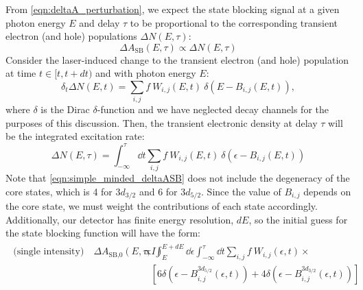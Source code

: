 From \cref{eqn:deltaA_perturbation}, we expect the state blocking signal at a given photon energy $E$ and delay $\tau$ to be proportional to the corresponding transient electron (and hole) populations $\Delta N(E, \tau)$:
\begin{equation}
\label{eqn:simple_minded_deltaASB}
\Delta A_{\textrm{SB}}(E,\tau) \propto \Delta N(E, \tau)
\end{equation}
Consider the laser-induced change to the transient electron (and hole) population at time $t \in [t, t+dt)$ and with photon energy $E$:
\begin{equation}
\delta_t \Delta N(E, t) = \sum_{i,j} f \ W_{i,j}(E, t) \ \delta(E-B_{i,j}(E, t)),
\end{equation}
where $\delta$ is the Dirac $\delta$-function and we have neglected decay channels for the purposes of this discussion. Then, the transient electronic density at delay $\tau$ will be the integrated excitation rate:
\begin{equation}
\Delta N(E, \tau) = \int_{-\infty}^{\tau} \dd{t} \sum_{i,j} f \ W_{i,j}(E, t) \ \delta(\epsilon-B_{i,j}(E, t))
\end{equation}
Note that \cref{eqn:simple_minded_deltaASB} does not include the degeneracy of the core states, which is 4 for $3d_{3/2}$ and 6 for $3d_{5/2}$. Since the value of $B_{i,j}$ depends on the core state, we must weight the contributions of each state accordingly. Additionally, our detector has finite energy resolution, $dE$, so the initial guess for the state blocking function will have the form:
\begin{align}
\label{eqn:nonlinear_deltaASB0}
\begin{split}
\textrm{(single intensity)} \quad \Delta A_{\textrm{SB,0}}(E,\tau; I) &\propto \int_{E}^{E+dE} \dd{\epsilon} \int_{-\infty}^{\tau} \dd{t} \sum_{i,j} f \ W_{i,j}(\epsilon, t) \times \\
& \quad \left[ 6 \delta(\epsilon-B_{i,j}^{3d_{5/2}}(\epsilon, t)) + 4 \delta(\epsilon-B_{i,j}^{3d_{3/2}}(\epsilon, t)) \right]
\end{split}
\end{align}

